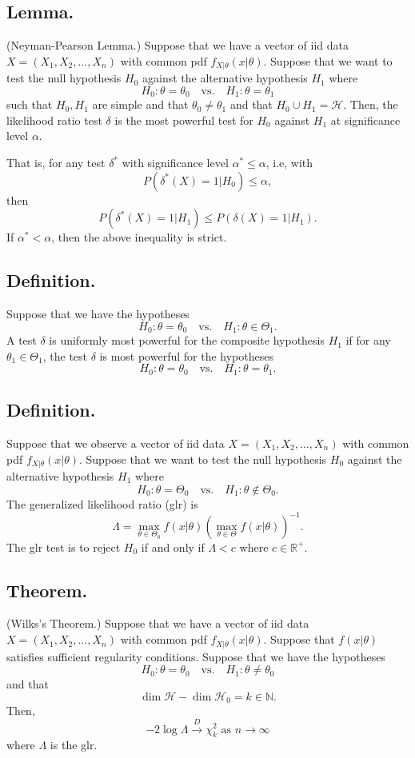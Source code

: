 \documentclass[titlepage]{article}
\begin{document}
\subsection{Lemma.} (Neyman-Pearson Lemma.) Suppose that we have a vector of iid data $X = (X_{1}, X_{2}, \ldots, X_{n})$ with common pdf $f_{X|\theta}(x|\theta)$. Suppose that we want to test the null hypothesis $H_{0}$ against the alternative hypothesis $H_{1}$ where 
$$H_{0}: \theta = \theta_{0} \quad \text{vs.} \quad H_{1}: \theta = \theta_{1}$$
such that $H_{0}, H_{1}$ are simple and that $\theta_{0} \neq \theta_{1}$ and that $H_{0} \cup H_{1} = \mathcal{H}$. Then, the likelihood ratio test $\delta$ is the most powerful test for $H_{0}$ against $H_{1}$ at significance level $\alpha$. 

That is, for any test $\delta^{*}$ with significance level $\alpha^{*} \leq \alpha$, i.e, with 
$$P(\delta^{*}(X)=1|H_{0}) \leq \alpha,$$
then 
$$P(\delta^{*}(X)=1|H_{1}) \leq P(\delta(X)=1|H_{1}).$$
If $\alpha^{*} < \alpha$, then the above inequality is strict.

\subsection{Definition.} Suppose that we have the hypotheses 
$$H_{0}: \theta = \theta_{0} \quad \text{vs.} \quad H_{1}: \theta \in \Theta_{1}.$$
A test $\delta$ is uniformly most powerful for the composite hypothesis $H_{1}$ if for any $\theta_{1} \in \Theta_{1}$, the test $\delta$ is most powerful for the hypotheses  
$$H_{0}: \theta = \theta_{0} \quad \text{vs.} \quad H_{1}: \theta = \theta_{1}.$$

\subsection{Definition.} Suppose that we observe a vector of iid data $X = (X_{1}, X_{2}, \ldots, X_{n})$ with common pdf $f_{X|\theta}(x|\theta)$. Suppose that we want to test the null hypothesis $H_{0}$ against the alternative hypothesis $H_{1}$ where 
$$H_{0}: \theta = \Theta_{0} \quad \text{vs.} \quad H_{1}: \theta \not\in \Theta_{0}.$$
The generalized likelihood ratio (glr) is 
$$\Lambda = \max_{\theta \in \Theta_{0}}f(x|\theta)(\max_{\theta \in \Theta}f(x|\theta))^{-1}.$$
The glr test is to reject $H_{0}$ if and only if $\Lambda < c$ where $c \in \mathbb{R}^{+}$.

\subsection{Theorem.} (Wilks's Theorem.) Suppose that we have a vector of iid data $X = (X_{1}, X_{2}, \ldots, X_{n})$ with common pdf $f_{X|\theta}(x|\theta)$. Suppose that $f(x|\theta)$ satisfies sufficient regularity conditions. Suppose that
we have the hypotheses 
$$H_{0}: \theta = \theta_{0} \quad \text{vs.} \quad H_{1}: \theta \neq \theta_{0}$$
and that 
$$\dim \mathcal{H} - \dim \mathcal{H}_{0} = k \in \mathbb{N}.$$
Then, 
$$-2\log\Lambda \xrightarrow{D} \chi_{k}^{2} \text{ as } n \to \infty$$
where $\Lambda$ is the glr.
\end{document}
